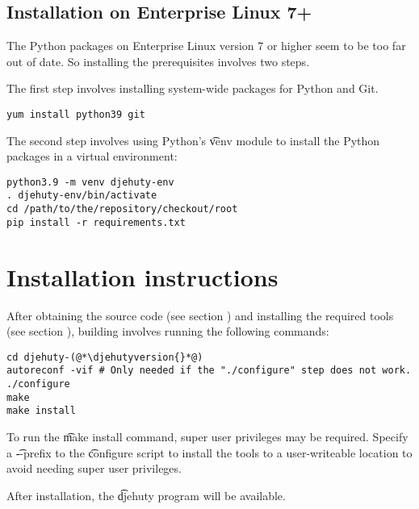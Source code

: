\subsection{Installation on Enterprise Linux 7+}

  The Python packages on Enterprise Linux version 7 or higher seem to
  be too far out of date.  So installing the prerequisites involves
  two steps.

  The first step involves installing system-wide packages for Python and Git.

\begin{lstlisting}
yum install python39 git
\end{lstlisting}

  The second step involves using Python's \t{venv} module to
  install the Python packages in a virtual environment:

\begin{lstlisting}
python3.9 -m venv djehuty-env
. djehuty-env/bin/activate
cd /path/to/the/repository/checkout/root
pip install -r requirements.txt
\end{lstlisting}

\section{Installation instructions}

  After obtaining the source code (see section )
  and installing the required tools (see section ),
  building involves running the following commands:

\begin{lstlisting}
cd djehuty-(@*\djehutyversion{}*@)
autoreconf -vif # Only needed if the "./configure" step does not work.
./configure
make
make install
\end{lstlisting}

  To run the \t{make install} command, super user privileges may be
  required.  Specify a \t{-{}-prefix} to the \t{configure}
  script to install the tools to a user-writeable location to avoid
  needing super user privileges.

  After installation, the \t{djehuty} program will be available.
